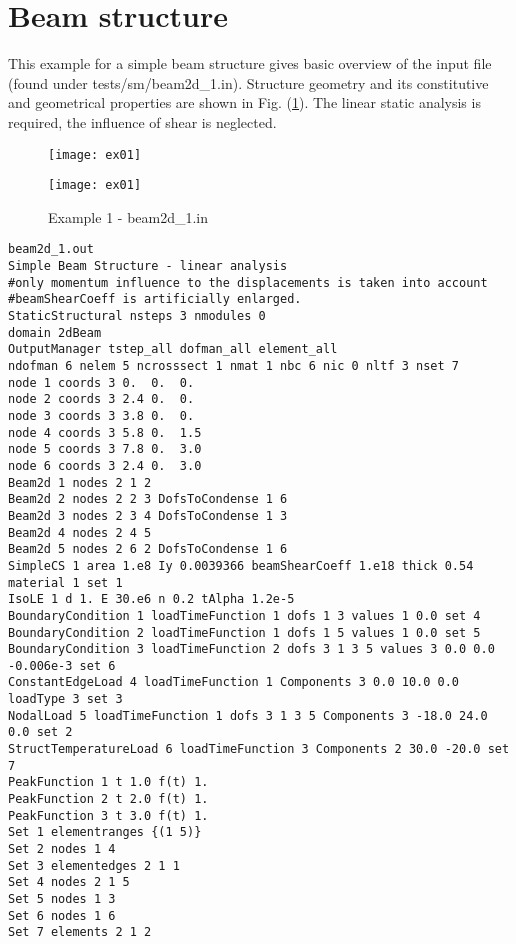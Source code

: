 \documentclass[a4paper]{report}
\begin{document}
\section {Beam structure}
This example for a simple beam structure gives basic overview of the input file (found under tests/sm/beam2d\_1.in).
Structure geometry and its constitutive and geometrical properties are shown in Fig. (\ref{ex01}).
The linear static analysis is required, the influence of shear is neglected.
\begin{figure}[htb]
\begin{htmlonly}
  \centerline{\texttt{[image: ex01]}}
\end{htmlonly}
\centerline{\texttt{[image: ex01]}}
\caption{Example 1 - beam2d\_1.in}
\label{ex01}

\end{figure}
{\small\begin{verbatim}
beam2d_1.out
Simple Beam Structure - linear analysis
#only momentum influence to the displacements is taken into account
#beamShearCoeff is artificially enlarged.
StaticStructural nsteps 3 nmodules 0
domain 2dBeam
OutputManager tstep_all dofman_all element_all
ndofman 6 nelem 5 ncrosssect 1 nmat 1 nbc 6 nic 0 nltf 3 nset 7
node 1 coords 3 0.  0.  0.
node 2 coords 3 2.4 0.  0.
node 3 coords 3 3.8 0.  0.
node 4 coords 3 5.8 0.  1.5
node 5 coords 3 7.8 0.  3.0
node 6 coords 3 2.4 0.  3.0
Beam2d 1 nodes 2 1 2 
Beam2d 2 nodes 2 2 3 DofsToCondense 1 6  
Beam2d 3 nodes 2 3 4 DofsToCondense 1 3 
Beam2d 4 nodes 2 4 5
Beam2d 5 nodes 2 6 2 DofsToCondense 1 6 
SimpleCS 1 area 1.e8 Iy 0.0039366 beamShearCoeff 1.e18 thick 0.54 material 1 set 1
IsoLE 1 d 1. E 30.e6 n 0.2 tAlpha 1.2e-5
BoundaryCondition 1 loadTimeFunction 1 dofs 1 3 values 1 0.0 set 4
BoundaryCondition 2 loadTimeFunction 1 dofs 1 5 values 1 0.0 set 5
BoundaryCondition 3 loadTimeFunction 2 dofs 3 1 3 5 values 3 0.0 0.0 -0.006e-3 set 6
ConstantEdgeLoad 4 loadTimeFunction 1 Components 3 0.0 10.0 0.0 loadType 3 set 3
NodalLoad 5 loadTimeFunction 1 dofs 3 1 3 5 Components 3 -18.0 24.0 0.0 set 2
StructTemperatureLoad 6 loadTimeFunction 3 Components 2 30.0 -20.0 set 7
PeakFunction 1 t 1.0 f(t) 1.
PeakFunction 2 t 2.0 f(t) 1.
PeakFunction 3 t 3.0 f(t) 1.
Set 1 elementranges {(1 5)}
Set 2 nodes 1 4
Set 3 elementedges 2 1 1
Set 4 nodes 2 1 5
Set 5 nodes 1 3
Set 6 nodes 1 6
Set 7 elements 2 1 2
\end{verbatim}}
\end{document}

